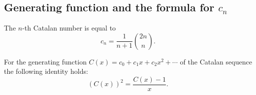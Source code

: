 \begin{page}
\setcounter{section}{4}
\setcounter{subsection}{2}
\setcounter{dfn}{2}
\label{portion:973}

\subsection{Generating function and the formula for $c_n$}
\label{sec:GenFuncCatalan}

\end{page}

\begin{page}
\setcounter{section}{4}
\setcounter{subsection}{2}
\setcounter{dfn}{3}
\label{portion:975}

\begin{thm}
\label{thm:CatalanFormula}
The $n$-th Catalan number is equal to
\begin{equation}
\label{eqn:CatalanFormula}
c_n = \frac1{n+1} \binom{2n}{n}.
\end{equation}
\end{thm}

\end{page}

\begin{page}
\setcounter{section}{4}
\setcounter{subsection}{2}
\setcounter{dfn}{4}
\label{portion:978}

\begin{lem}
\label{lem:CatalanGenFunc}
For the generating function $C(x) = c_0 + c_1 x + c_2 x^2 + \cdots$ of the Catalan sequence
the following identity holds:
\[
(C(x))^2 = \frac{C(x) - 1}{x}.
\]
\end{lem}

\end{page}

